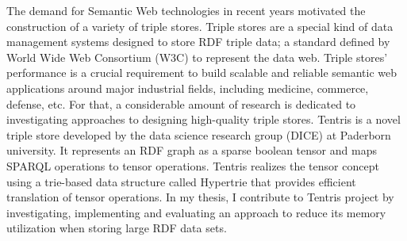 The demand for Semantic Web technologies in recent years motivated the construction of a variety of triple stores.
Triple stores are a special kind of data management systems designed to store RDF triple data; a standard defined by 
World Wide Web Consortium (W3C) to represent the data web. 
Triple stores' performance is a crucial requirement to build scalable and reliable semantic web applications around major industrial fields, including medicine, commerce, defense, etc. For that, a considerable amount of research is dedicated to investigating approaches to designing high-quality triple stores. Tentris is a novel triple store developed by the data science research group (DICE) at Paderborn university. It represents an RDF graph as a sparse boolean tensor and maps SPARQL operations to tensor operations. Tentris realizes the tensor concept using a trie-based data structure called Hypertrie that provides efficient translation of tensor operations. In my thesis, I contribute to Tentris project by investigating, implementing and evaluating an approach to reduce its memory utilization when storing large RDF data sets.
